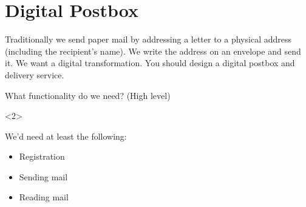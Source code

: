 \mode*

\section{Digital Postbox}

Traditionally we send paper mail by addressing a letter to a physical address 
(including the recipient's name).
We write the address on an envelope and send it.
We want a digital transformation.
You should design a digital postbox and delivery service.


\begin{frame}
\begin{exercise}
  What functionality do we need? (High level)
\end{exercise}

\begin{onlyenv}<2>
  \begin{solution}
    We'd need at least the following:
    \begin{itemize}
      \item Registration
      \item Sending mail
      \item Reading mail
    \end{itemize}
  \end{solution}
\end{onlyenv}
\end{frame}

